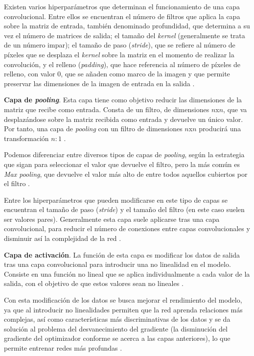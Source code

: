 Existen varios hiperparámetros que determinan el funcionamiento de una capa convolucional. Entre ellos se encuentran el número de filtros que aplica la capa sobre la matriz de entrada, también denominado profundidad, que determina a su vez el número de matrices de salida; el tamaño del \textit{kernel} (generalmente se trata de un número impar); el tamaño de paso (\textit{stride}), que se refiere al número de píxeles que se desplaza el \textit{kernel} sobre la matriz en el momento de realizar la convolución, y el relleno (\textit{padding}), que hace referencia al número de píxeles de relleno, con valor $0$, que se añaden como marco de la imagen y que permite preservar las dimensiones de la imagen de entrada en la salida \cite{cnn:osea, cnn:ieee}.

\textbf{Capa de \textit{pooling}}. Esta capa tiene como objetivo reducir las dimensiones de la matriz que recibe como entrada. Consta de un filtro, de dimensiones $n$x$n$, que va desplazándose sobre la matriz recibida como entrada y devuelve un único valor. Por tanto, una capa de \textit{pooling} con un filtro de dimensiones $n$x$n$ producirá una transformación $n:1$ \cite{cnn:cheatsheet, cnn:osea}.

Podemos diferenciar entre diversos tipos de capas de \textit{pooling}, según la estrategia que sigan para seleccionar el valor que devuelve el filtro, pero la más común es \textit{Max pooling}, que devuelve el valor más alto de entre todos aquellos cubiertos por el filtro \cite{cnn:ieee, cnn:cheatsheet}.

Entre los hiperparámetros que pueden modificarse en este tipo de capas se encuentran el tamaño de paso (\textit{stride}) y el tamaño del filtro (en este caso suelen ser valores pares). Generalmente esta capa suele aplicarse tras una capa convolucional, para reducir el número de conexiones entre capas convolucionales y disminuir así la complejidad de la red \cite{cnn:gu}.

\textbf{Capa de activación}. La función de esta capa es modificar los datos de salida tras una capa convolucional para introducir una no linealidad en el modelo. Consiste en una función no lineal que se aplica individualmente a cada valor de la salida, con el objetivo de que estos valores sean no lineales \cite{cnn:ieee, cnn:gu}.

Con esta modificación de los datos se busca mejorar el rendimiento del modelo, ya que al introducir no linealidades permiten que la red aprenda relaciones más complejas, así como características más discriminativas de los datos y se da solución al problema del desvanecimiento del gradiente (la disminución del gradiente del optimizador conforme se acerca a las capas anteriores), lo que permite entrenar redes más profundas \cite{cnn:activacion, cnn:biblia_deeplearning}.

